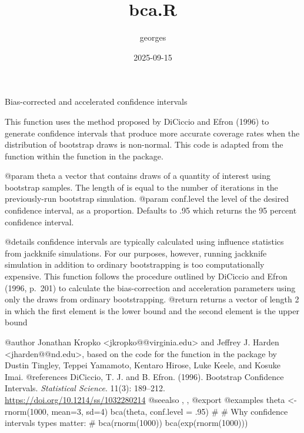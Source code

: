 \documentclass[
]{article}
\title{bca.R}
\author{georges}
\date{2025-09-15}
\begin{document}
\maketitle

Bias-corrected and accelerated confidence intervals

This function uses the method proposed by DiCiccio and Efron (1996) to
generate confidence intervals that produce more accurate coverage rates
when the distribution of bootstrap draws is non-normal. This code is
adapted from the  function within the
 function in the 
package.

@param theta a vector that contains draws of a quantity of interest
using bootstrap samples. The length of  is equal to the
number of iterations in the previously-run bootstrap simulation. @param
conf.level the level of the desired confidence interval, as a
proportion. Defaults to .95 which returns the 95 percent confidence
interval.

@details  confidence intervals are typically calculated using
influence statistics from jackknife simulations. For our purposes,
however, running jackknife simulation in addition to ordinary
bootstrapping is too computationally expensive. This function follows
the procedure outlined by DiCiccio and Efron (1996, p.~201) to calculate
the bias-correction and acceleration parameters using only the draws
from ordinary bootstrapping. @return returns a vector of length 2 in
which the first element is the lower bound and the second element is the
upper bound

@author Jonathan Kropko \textless jkropko@@virginia.edu\textgreater{}
and Jeffrey J. Harden \textless jharden@@nd.edu\textgreater, based on
the code for the  function in the
 package by Dustin Tingley, Teppei Yamamoto, Kentaro
Hirose, Luke Keele, and Kosuke Imai. @references DiCiccio, T. J. and B.
Efron. (1996). Bootstrap Confidence Intervals.
\emph{Statistical Science}. 11(3): 189--212.
\url{https://doi.org/10.1214/ss/1032280214} @seealso
, ,
 @export @examples theta \textless-
rnorm(1000, mean=3, sd=4) bca(theta, conf.level = .95) \# \# Why
confidence intervals types matter: \# bca(rnorm(1000))
bca(exp(rnorm(1000)))
\end{document}
